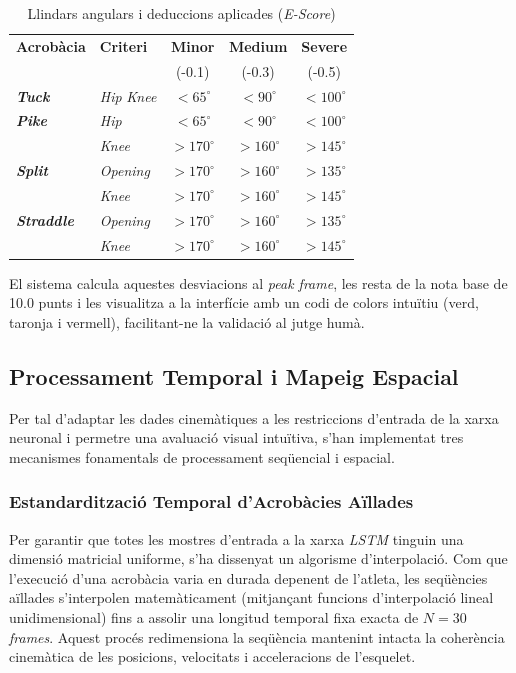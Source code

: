 \documentclass[10pt,a4paper,twocolumn,twoside]{article}
\begin{document}
\begin{table}[H]
\centering
\caption{Llindars angulars i deduccions aplicades (\textit{E-Score})}
\label{tab:thresholds}
\renewcommand{\arraystretch}{1.5}
\begin{tabular}{l p{1.25cm} ccc}
\hline
\textbf{Acrobàcia} & \textbf{Criteri} & \textbf{Minor} & \textbf{Medium} & \textbf{Severe} \\ 
 & & (-0.1) & (-0.3) & (-0.5) \\ \hline
\textit{\textbf{Tuck}} & \textit{Hip} \newline \textit{Knee} & $< 65^\circ$ & $< 90^\circ$ & $< 100^\circ$ \\ \hline
\textit{\textbf{Pike}} & \textit{Hip} & $< 65^\circ$ & $< 90^\circ$ & $< 100^\circ$ \\
 & \textit{Knee} & $> 170^\circ$ & $> 160^\circ$ & $> 145^\circ$ \\ \hline
\textit{\textbf{Split}} & \textit{Opening} & $> 170^\circ$ & $> 160^\circ$ & $> 135^\circ$ \\
 & \textit{Knee} & $> 170^\circ$ & $> 160^\circ$ & $> 145^\circ$ \\ \hline
\textit{\textbf{Straddle}} & \textit{Opening} & $> 170^\circ$ & $> 160^\circ$ & $> 135^\circ$ \\
 & \textit{Knee} & $> 170^\circ$ & $> 160^\circ$ & $> 145^\circ$ \\ \hline
\end{tabular}
\end{table}

El sistema calcula aquestes desviacions al \textit{peak frame}, les resta de la nota base de 10.0 punts i les visualitza a la interfície amb un codi de colors intuïtiu (verd, taronja i vermell), facilitant-ne la validació al jutge humà.

\subsection{Processament Temporal i Mapeig Espacial}

Per tal d'adaptar les dades cinemàtiques a les restriccions d'entrada de la xarxa neuronal i permetre una avaluació visual intuïtiva, s'han implementat tres mecanismes fonamentals de processament seqüencial i espacial.

\subsubsection{Estandardització Temporal d'Acrobàcies Aïllades}
Per garantir que totes les mostres d'entrada a la xarxa \textit{LSTM} tinguin una dimensió matricial uniforme, s'ha dissenyat un algorisme d'interpolació. Com que l'execució d'una acrobàcia varia en durada depenent de l'atleta, les seqüències aïllades s'interpolen matemàticament (mitjançant funcions d'interpolació lineal unidimensional) fins a assolir una longitud temporal fixa exacta de $N=30$ \textit{frames}. Aquest procés redimensiona la seqüència mantenint intacta la coherència cinemàtica de les posicions, velocitats i acceleracions de l'esquelet.
\end{document}
